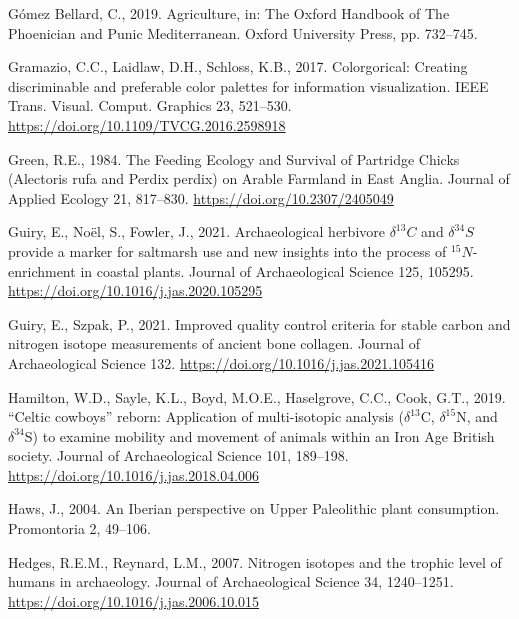 \documentclass[preprint, 3p, authoryear]{elsarticle} %
\newlength{\cslhangindent}
\newlength{\cslentryspacingunit} %
\newenvironment{CSLReferences}[2] %
 {%
  \setlength{\parindent}{0pt}
  \ifodd #1
  \let\oldpar\par
  \def\par{\hangindent=\cslhangindent\oldpar}
  \fi
  \setlength{\parskip}{#2\cslentryspacingunit}
 }%
 {}
\begin{document}
\begin{CSLReferences}{1}{0}
\leavevmode{}%
Gómez Bellard, C., 2019. Agriculture, in: The {Oxford Handbook} of {The Phoenician} and {Punic Mediterranean}. {Oxford University Press}, pp. 732--745.

\leavevmode{}%
Gramazio, C.C., Laidlaw, D.H., Schloss, K.B., 2017. Colorgorical: {Creating} discriminable and preferable color palettes for information visualization. IEEE Trans. Visual. Comput. Graphics 23, 521--530. \url{https://doi.org/10.1109/TVCG.2016.2598918}

\leavevmode{}%
Green, R.E., 1984. The {Feeding Ecology} and {Survival} of {Partridge Chicks} ({Alectoris} rufa and {Perdix} perdix) on {Arable Farmland} in {East Anglia}. Journal of Applied Ecology 21, 817--830. \url{https://doi.org/10.2307/2405049}

\leavevmode{}%
Guiry, E., Noël, S., Fowler, J., 2021. Archaeological herbivore {\(\delta ^{13}C\)} and {\(\delta ^{34}S\)} provide a marker for saltmarsh use and new insights into the process of {\(^{15}N\)-enrichment} in coastal plants. Journal of Archaeological Science 125, 105295. \url{https://doi.org/10.1016/j.jas.2020.105295}

\leavevmode{}%
Guiry, E., Szpak, P., 2021. Improved quality control criteria for stable carbon and nitrogen isotope measurements of ancient bone collagen. Journal of Archaeological Science 132. \url{https://doi.org/10.1016/j.jas.2021.105416}

\leavevmode{}%
Hamilton, W.D., Sayle, K.L., Boyd, M.O.E., Haselgrove, C.C., Cook, G.T., 2019. {``{Celtic} cowboys''} reborn: Application of multi-isotopic analysis ({\(\delta^{13}\)C}, {\(\delta^{15}\)N}, and {\(\delta^{34}\)S}) to examine mobility and movement of animals within an {Iron Age British} society. Journal of Archaeological Science 101, 189--198. \url{https://doi.org/10.1016/j.jas.2018.04.006}

\leavevmode{}%
Haws, J., 2004. An {Iberian} perspective on {Upper Paleolithic} plant consumption. Promontoria 2, 49--106.

\leavevmode{}%
Hedges, R.E.M., Reynard, L.M., 2007. Nitrogen isotopes and the trophic level of humans in archaeology. Journal of Archaeological Science 34, 1240--1251. \url{https://doi.org/10.1016/j.jas.2006.10.015}


\end{CSLReferences}
\end{document}
